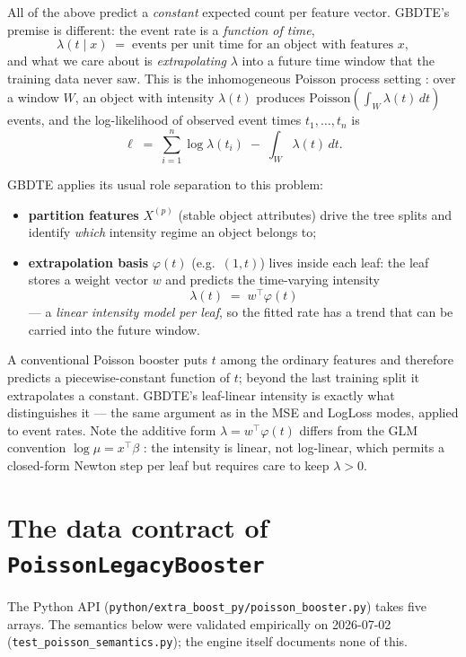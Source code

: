 \documentclass[11pt]{article}
\newcommand{\code}[1]{\texttt{\small #1}}
\begin{document}
All of the above predict a \emph{constant} expected count per feature vector. GBDTE's
premise is different: the event rate is a \emph{function of time},
\[
\lambda(t \mid x) \;=\; \text{events per unit time for an object with features } x,
\]
and what we care about is \emph{extrapolating} $\lambda$ into a future time window that
the training data never saw. This is the inhomogeneous Poisson process setting
\cite{daley2003}: over a window $W$, an object with intensity $\lambda(t)$ produces
$\mathrm{Poisson}\!\left(\int_W \lambda(t)\,dt\right)$ events, and the log-likelihood of
observed event times $t_1,\dots,t_n$ is
\begin{equation}
\label{eq:pp-loglik}
\ell \;=\; \sum_{i=1}^{n} \log \lambda(t_i) \;-\; \int_W \lambda(t)\,dt .
\end{equation}

GBDTE applies its usual role separation to this problem:
\begin{itemize}
\item \textbf{partition features} $X^{(p)}$ (stable object attributes) drive the tree
      splits and identify \emph{which} intensity regime an object belongs to;
\item \textbf{extrapolation basis} $\varphi(t)$ (e.g.\ $(1, t)$) lives inside each leaf:
      the leaf stores a weight vector $w$ and predicts the time-varying intensity
      \[
      \lambda(t) \;=\; w^\top \varphi(t)
      \]
      --- a \emph{linear intensity model per leaf}, so the fitted rate has a trend that
      can be carried into the future window.
\end{itemize}
A conventional Poisson booster puts $t$ among the ordinary features and therefore
predicts a piecewise-constant function of $t$; beyond the last training split it
extrapolates a constant. GBDTE's leaf-linear intensity is exactly what
distinguishes it --- the same argument as in the MSE and LogLoss modes, applied to
event rates. Note the additive form $\lambda = w^\top\varphi(t)$ differs from the
GLM convention $\log\mu = x^\top\beta$ \cite{mccullagh1989}: the intensity is linear,
not log-linear, which permits a closed-form Newton step per leaf but requires care to
keep $\lambda > 0$.

\section{The data contract of \code{PoissonLegacyBooster}}

The Python API (\code{python/extra\_boost\_py/poisson\_booster.py}) takes five arrays.
The semantics below were validated empirically on 2026-07-02
(\code{test\_poisson\_semantics.py}); the engine itself documents none of this.
\end{document}
